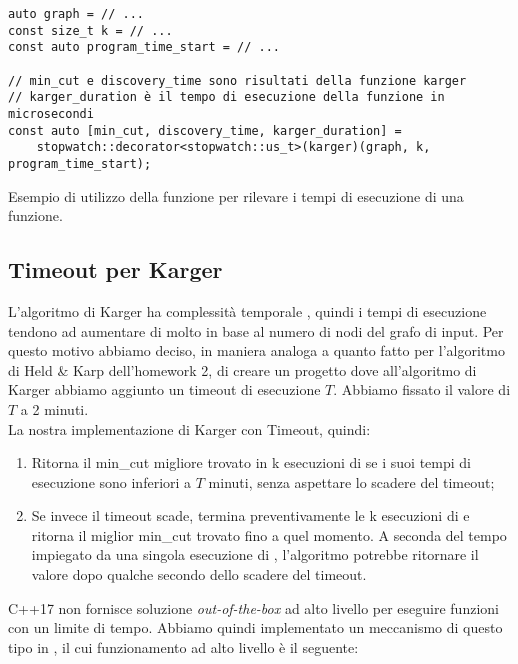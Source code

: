\begin{listing}[!ht]
\begin{verbatim}
auto graph = // ...
const size_t k = // ...
const auto program_time_start = // ...

// min_cut e discovery_time sono risultati della funzione karger
// karger_duration è il tempo di esecuzione della funzione in microsecondi
const auto [min_cut, discovery_time, karger_duration] =
    stopwatch::decorator<stopwatch::us_t>(karger)(graph, k, program_time_start);

\end{verbatim}
\caption{Esempio di utilizzo della funzione  per
  rilevare i tempi di esecuzione di una funzione.}
\label{listings:stopwatch-decorator-usage}
\end{listing}

\subsection{Timeout per Karger}

\noindent L'algoritmo di Karger ha complessità temporale \complexityKargerTime{}, quindi i tempi di esecuzione tendono ad aumentare di molto in base al numero di nodi del grafo di input. Per questo motivo abbiamo deciso, in maniera analoga a quanto fatto per l'algoritmo di Held \& Karp dell'homework 2, di creare un progetto dove all'algoritmo di Karger abbiamo aggiunto un timeout di esecuzione $T$. Abbiamo fissato il valore di $T$ a 2 minuti.\\

\noindent La nostra implementazione di Karger con Timeout, quindi:

\begin{enumerate}
    \item Ritorna il min\_cut migliore trovato in k esecuzioni di  se i suoi tempi di esecuzione sono inferiori a $T$ minuti, senza aspettare lo scadere del timeout;
    \item Se invece il timeout scade, termina preventivamente le k esecuzioni di  e ritorna il miglior min\_cut trovato fino a quel momento. A seconda del tempo impiegato da una singola esecuzione di , l'algoritmo potrebbe ritornare il valore dopo qualche secondo dello scadere del timeout.
\end{enumerate}

\noindent C++17 non fornisce soluzione \textit{out-of-the-box} ad alto livello per eseguire funzioni con un limite di tempo. Abbiamo quindi implementato un meccanismo di questo tipo in , il cui funzionamento ad alto livello è il seguente:

